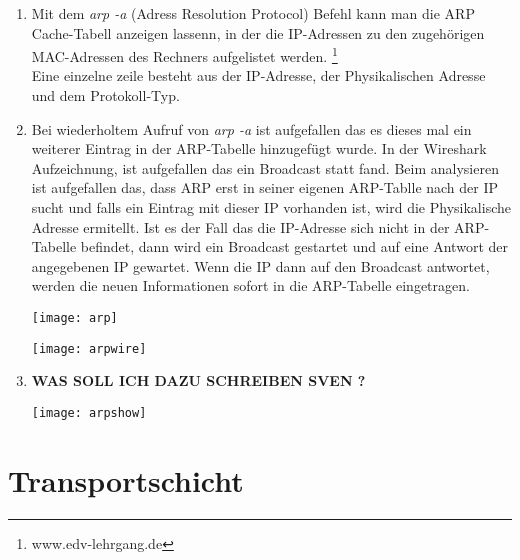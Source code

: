 \documentclass{scrartcl}
\begin{document}
  \renewcommand{\labelenumi}{\alph{enumi})}
  \begin{enumerate}
  \item
  Mit dem \textit{arp -a} (Adress Resolution Protocol) Befehl kann man die ARP Cache-Tabell anzeigen lassenn, in der die IP-Adressen zu den zugehörigen MAC-Adressen des Rechners aufgelistet werden. \footnote{www.edv-lehrgang.de}\\
  Eine einzelne zeile besteht aus der IP-Adresse, der Physikalischen Adresse und dem Protokoll-Typ.
  
  \item
  Bei wiederholtem Aufruf von \textit{arp -a} ist aufgefallen das es dieses mal ein weiterer Eintrag in der ARP-Tabelle hinzugefügt wurde. In der Wireshark Aufzeichnung, ist aufgefallen das ein Broadcast statt fand. Beim analysieren ist aufgefallen das, dass ARP erst in seiner eigenen ARP-Tablle nach der IP sucht und falls ein Eintrag mit dieser IP vorhanden ist, wird die Physikalische Adresse ermitellt. Ist es der Fall das die IP-Adresse sich nicht in der ARP-Tabelle befindet, dann wird ein Broadcast gestartet und auf eine Antwort der angegebenen IP gewartet. Wenn die IP dann auf den Broadcast antwortet, werden die neuen Informationen sofort in die ARP-Tabelle eingetragen.
  
   \texttt{[image: arp]}
   \label{fig:arp}

   \texttt{[image: arpwire]}
   \label{fig:arpwire}

  \item
  \textbf{WAS SOLL ICH DAZU SCHREIBEN SVEN ?}
  
   \texttt{[image: arpshow]}
   \label{fig:arpshow}

  \end{enumerate}    

  \newpage
\section[Versuch 6 Transportschicht]{Transportschicht}
  
  
\end{document}
